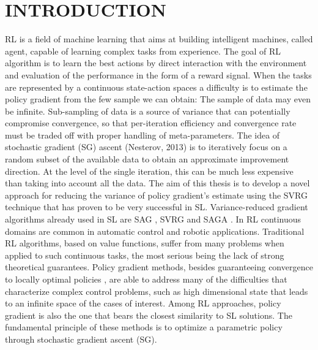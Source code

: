 \chapter{INTRODUCTION} \label{chap:aChapter}

\ac{RL} is a field of machine learning that aims at building intelligent machines, called agent, capable of learning complex tasks from experience.
The goal of \acs{RL} \citep{sutton1998reinforcement} algorithm is to learn the best actions by direct interaction with the environment and evaluation of the performance in the form of a reward signal.
When the tasks are represented by a continuous state-action spaces a difficulty is to estimate the policy gradient from the few sample we can obtain:  The sample of data may even be infinite. Sub-sampling of data is a source of variance that can potentially compromise convergence, so that per-iteration efficiency and convergence rate must be traded off with proper handling of meta-parameters.
The idea of stochastic gradient (SG) ascent (Nesterov, 2013) is to iteratively focus on a random subset of the available data to obtain an approximate improvement direction. At the level of the single iteration, this can be much less expensive than taking into account all the data.
The aim of this thesis is to develop a novel approach for reducing the variance of policy gradient's estimate using the \acs{SVRG}\cite{allen2016variance} technique that has proven to be very successful in \ac{SL}.\newline
Variance-reduced gradient algorithms already used in \acs{SL} are SAG \citep{roux2012stochastic}, SVRG \citep{allen2016variance} and SAGA \citep{defazio2014saga}.\newline
In \acs{RL} continuous domains are common in automatic control and robotic applications. Traditional RL algorithms, based on value functions, suffer from many problems when applied to such continuous tasks, the most serious being the lack of strong theoretical guarantees. Policy gradient methods, besides guaranteeing convergence to locally optimal policies \citep{sutton2000policy}, are able to address many of the difficulties that characterize complex control problems, such as high dimensional state that leads to an infinite space of the cases of interest. 
Among RL approaches, policy gradient is also the one that bears the closest similarity to \acs{SL} solutions. The fundamental principle of these methods is to optimize a parametric policy through stochastic gradient ascent (\acs{SG}).
